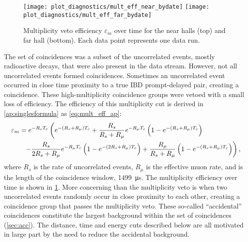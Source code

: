 \begin{figure}
    \centering
    \texttt{[image: plot\_diagnostics/mult\_eff\_near\_bydate]}
    \texttt{[image: plot\_diagnostics/mult\_eff\_far\_bydate]}
    \caption[Multiplicity veto efficiency over time]{
        Multiplicity veto efficiency $\varepsilon_m$ over time for
        the near halls (top) and far hall (bottom).
        Each data point represents one data run.
    }
    \label{fig:mult_eff}
\end{figure}
The set of  coincidences was a subset
of the uncorrelated events, mostly radioactive decays,
that were also present in the data stream.
However, not all uncorrelated events formed  coincidences.
Sometimes an uncorrelated event occurred in close time proximity to
a true IBD prompt-delayed pair, creating a  coincidence.
These high-multiplicity coincidence groups were vetoed
with a small loss of efficiency.
The efficiency of this multiplicity cut is derived in \cref{ap:singlesformula} as
\cref{eq:mult_eff_ap}:
\begin{align}
    \label{eq:mult_eff}
    \begin{split}
        \varepsilon_m &= e^{-R_s T_c}
        \left(
            e^{-(R_s + R_\mu)T_c} +
            \frac{R_s}{R_s+R_\mu} e^{-R_\mu T_c}
            \left(
                1 - e^{-(R_s + R_\mu)T_c}
            \right)
        \right. \\
              &\ \ \left. - \frac{R_s}{2R_s + R_\mu} e^{-R_\mu T_c}
                  \left(
                      1 - e^{-(2R_s + R_\mu)T_c}
                  \right) +
                  \frac{R_\mu}{R_s + R_\mu}
                  \left(
                      1 - e^{-(R_s + R_\mu)T_c}
                  \right)
              \right),
    \end{split}
\end{align}
where $R_s$ is the rate of uncorrelated events,
$R_\mu$ is the effective muon rate,
and \tc{} is the length of the coincidence window, \SI{1499}{\us}.
The multiplicity efficiency over time is shown in \cref{fig:mult_eff}.
More concerning than the multiplicity veto is when two uncorrelated events
randomly occur in close proximity to each other,
creating a  coincidence group that passes the multiplicity veto.
These so-called ``accidental'' coincidences
constitute the largest background within the set of  coincidences
(\cref{sec:acc}).
The distance, time and energy cuts described below
are all motivated in large part by the need to reduce the accidental background.

